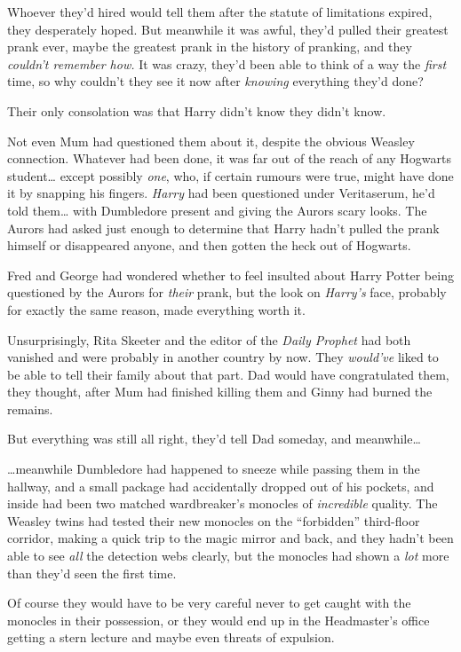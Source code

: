 Whoever they'd hired would tell them after the statute of limitations
expired, they desperately hoped. But meanwhile it was awful, they'd
pulled their greatest prank ever, maybe the greatest prank in the
history of pranking, and they \emph{couldn't remember how.} It was
crazy, they'd been able to think of a way the \emph{first} time, so why
couldn't they see it now after \emph{knowing} everything they'd done?

Their only consolation was that Harry didn't know they didn't know.

Not even Mum had questioned them about it, despite the obvious Weasley
connection. Whatever had been done, it was far out of the reach of any
Hogwarts student\ldots{} except possibly \emph{one}, who, if certain
rumours were true, might have done it by snapping his fingers.
\emph{Harry} had been questioned under Veritaserum, he'd told
them\ldots{} with Dumbledore present and giving the Aurors scary looks.
The Aurors had asked just enough to determine that Harry hadn't pulled
the prank himself or disappeared anyone, and then gotten the heck out of
Hogwarts.

Fred and George had wondered whether to feel insulted about Harry Potter
being questioned by the Aurors for \emph{their} prank, but the look on
\emph{Harry's} face, probably for exactly the same reason, made
everything worth it.

Unsurprisingly, Rita Skeeter and the editor of the \emph{Daily Prophet}
had both vanished and were probably in another country by now. They
\emph{would've} liked to be able to tell their family about that part.
Dad would have congratulated them, they thought, after Mum had finished
killing them and Ginny had burned the remains.

But everything was still all right, they'd tell Dad someday, and
meanwhile\ldots{}

\ldots{}meanwhile Dumbledore had happened to sneeze while passing them
in the hallway, and a small package had accidentally dropped out of his
pockets, and inside had been two matched wardbreaker's monocles of
\emph{incredible} quality. The Weasley twins had tested their new
monocles on the ``forbidden'' third-floor corridor, making a quick trip
to the magic mirror and back, and they hadn't been able to see
\emph{all} the detection webs clearly, but the monocles had shown a
\emph{lot} more than they'd seen the first time.

Of course they would have to be very careful never to get caught with
the monocles in their possession, or they would end up in the
Headmaster's office getting a stern lecture and maybe even threats of
expulsion.

